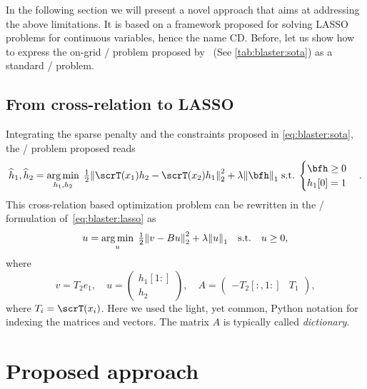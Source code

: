 \mynewline
In the following section we will present a novel approach that aims at addressing the above limitations.
It is based on a framework proposed for solving \ac{LASSO} problems for continuous variables, hence the name \ac{CD}.
Before, let us show how to express the on-grid \BCE/ problem proposed by~ (See \cref{tab:blaster:sota}) as a standard \LASSO/ problem.

\subsection{From cross-relation to LASSO}
Integrating the sparse penalty and the constraints proposed in \cref{eq:blaster:sota},
the \BSNdef/ problem proposed reads
\begin{equation}\label{eq:blaster:bsn}
    \disFilterHat_1, \disFilterHat_2
    =
    \kargmin_{\disFilter_1, \disFilter_2}
    \;
    \tfrac{1}{2}
    \kvvbar{
        \scrT(\disRecordedSignal_1) \disFilter_2
        -
        \scrT(\disRecordedSignal_2) \disFilter_1
    }_2^2
    + \lambda\kvvbar{\bfh}_1
    \;\text{s.t.}\;
    \begin{cases}
        \bfh \geq 0\\
        h_1[0] = 1
    \end{cases}
    .
\end{equation}
This cross-relation based optimization problem can be rewritten in the \LASSO/ formulation of~\cref{eq:blaster:lasso} as
\begin{equation*}
    u
    =
    \kargmin_{u}
    \;
    \tfrac{1}{2}
    \kvvbar{ v - B u }_2^2
    + \lambda\kvvbar{u}_1
    \quad\text{s.t.}\quad
    u \geq 0
    ,
\end{equation*}
where
\begin{equation*}
    v = T_2e_1,
    \quad
    u =
    \begin{pmatrix}
        h_1[1:] \\
        h_2
    \end{pmatrix},
    \quad
    A =
    \begin{pmatrix}
        -T_2[:, 1:] & T_1
    \end{pmatrix}
    ,
\end{equation*}
where $T_i = \scrT(x_i)$.
Here we used the light, yet common, Python notation for indexing the matrices and vectors.
The matrix $A$ is typically called \textit{dictionary}.


\section{Proposed approach}


